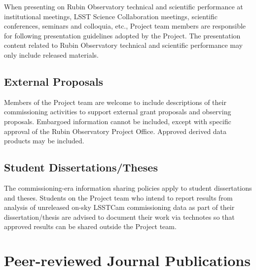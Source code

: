 \documentclass[SE,authoryear,toc,lsstdraft]{lsstdoc}
\begin{document}
When presenting on Rubin Observatory technical and scientific performance at institutional meetings, LSST Science Collaboration meetings, scientific conferences, seminars and colloquia, etc., Project team members are responsible for following presentation guidelines adopted by the Project.
The presentation content related to Rubin Observatory technical and scientific performance may only include released materials.

\subsection{External Proposals}

Members of the Project team are welcome to include descriptions of their commissioning activities to support external grant proposals and observing proposals.
Embargoed information cannot be included, except with specific approval of the Rubin Observatory Project Office.
Approved derived data products may be included.

\subsection{Student Dissertations/Theses}

The commissioning-era information sharing policies apply to student dissertations and theses.
Students on the Project team who intend to report results from analysis of unreleased on-sky LSSTCam commissioning data as part of their dissertation/thesis are advised to document their work via technotes so that approved results can be shared outside the Project team.

\section{Peer-reviewed Journal Publications}
\label{publications}
\end{document}
